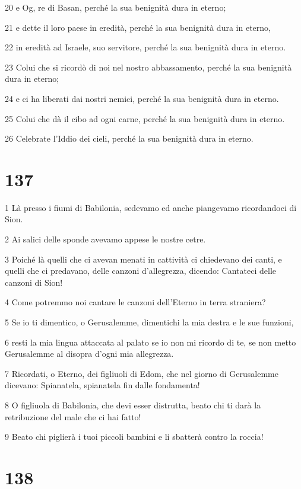 \par 20 e Og, re di Basan, perché la sua benignità dura in eterno;
\par 21 e dette il loro paese in eredità, perché la sua benignità dura in eterno,
\par 22 in eredità ad Israele, suo servitore, perché la sua benignità dura in eterno.
\par 23 Colui che si ricordò di noi nel nostro abbassamento, perché la sua benignità dura in eterno;
\par 24 e ci ha liberati dai nostri nemici, perché la sua benignità dura in eterno.
\par 25 Colui che dà il cibo ad ogni carne, perché la sua benignità dura in eterno.
\par 26 Celebrate l'Iddio dei cieli, perché la sua benignità dura in eterno.

\chapter{137}

\par 1 Là presso i fiumi di Babilonia, sedevamo ed anche piangevamo ricordandoci di Sion.
\par 2 Ai salici delle sponde avevamo appese le nostre cetre.
\par 3 Poiché là quelli che ci avevan menati in cattività ci chiedevano dei canti, e quelli che ci predavano, delle canzoni d'allegrezza, dicendo: Cantateci delle canzoni di Sion!
\par 4 Come potremmo noi cantare le canzoni dell'Eterno in terra straniera?
\par 5 Se io ti dimentico, o Gerusalemme, dimentichi la mia destra e le sue funzioni,
\par 6 resti la mia lingua attaccata al palato se io non mi ricordo di te, se non metto Gerusalemme al disopra d'ogni mia allegrezza.
\par 7 Ricordati, o Eterno, dei figliuoli di Edom, che nel giorno di Gerusalemme dicevano: Spianatela, spianatela fin dalle fondamenta!
\par 8 O figliuola di Babilonia, che devi esser distrutta, beato chi ti darà la retribuzione del male che ci hai fatto!
\par 9 Beato chi piglierà i tuoi piccoli bambini e li sbatterà contro la roccia!

\chapter{138}

